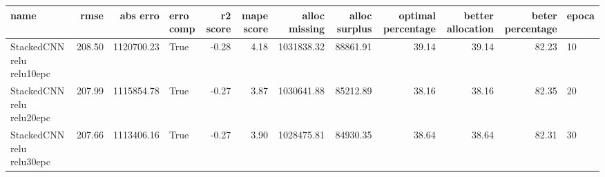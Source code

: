 \begin{tabular}{lrrlrrrrrrrl}
\toprule
name & rmse & abs erro & erro comp & r2 score & mape score & alloc missing & alloc surplus & optimal percentage & better allocation & beter percentage & epoca \\
\midrule
StackedCNN relu relu10epc & 208.50 & 1120700.23 & True & -0.28 & 4.18 & 1031838.32 & 88861.91 & 39.14 & 39.14 & 82.23 & 10 \\
StackedCNN relu relu20epc & 207.99 & 1115854.78 & True & -0.27 & 3.87 & 1030641.88 & 85212.89 & 38.16 & 38.16 & 82.35 & 20 \\
StackedCNN relu relu30epc & 207.66 & 1113406.16 & True & -0.27 & 3.90 & 1028475.81 & 84930.35 & 38.64 & 38.64 & 82.31 & 30 \\
\bottomrule
\end{tabular}
